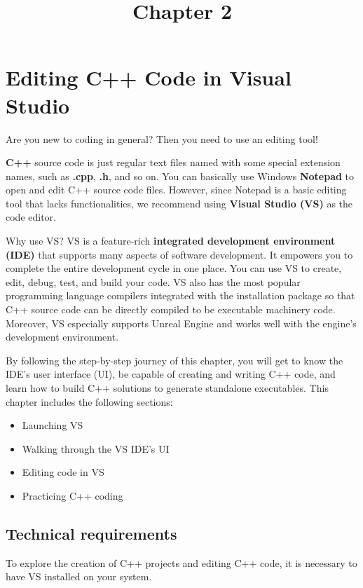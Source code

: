 \documentclass[11pt]{article} %
\title{Chapter 2}
\date{} %
\begin{document}
\maketitle

\section*{Editing C++ Code in Visual Studio}

Are you new to coding in general? Then you need to use an editing tool!

\textbf{C++} source code is just regular text files named with some special extension names, such as \textbf{.cpp}, \textbf{.h}, and so on. You can basically use Windows \textbf{Notepad} to open and edit C++ source code files. However, since Notepad is a basic editing tool that lacks functionalities, we recommend using \textbf{Visual Studio (VS)} as the code editor.

Why use VS? VS is a feature-rich \textbf{integrated development environment (IDE)} that supports many aspects of software development. It empowers you to complete the entire development cycle in one place. You can use VS to create, edit, debug, test, and build your code. VS also has the most popular programming language compilers integrated with the installation package so that C++ source code can be directly compiled to be executable machinery code. Moreover, VS especially supports Unreal Engine and works well with the engine’s development environment.

By following the step-by-step journey of this chapter, you will get to know the IDE’s user interface (UI), be capable of creating and writing C++ code, and learn how to build C++ solutions to generate standalone executables. This chapter includes the following sections:

\begin{itemize}
\item Launching VS
\item Walking through the VS IDE’s UI
\item Editing code in VS
\item Practicing C++ coding
\end{itemize}

\subsection*{Technical requirements}

To explore the creation of C++ projects and editing C++ code, it is necessary to have VS installed on your system.
\end{document}
